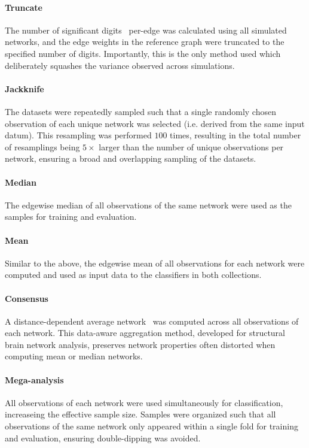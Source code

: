\documentclass[10pt]{SelfArx} %
\begin{document}
\paragraph{Truncate} The number of significant digits~\cite{Parker1997-qq} per-edge was calculated using all
simulated networks, and the edge weights in the reference graph were truncated to the specified number of digits.
Importantly, this is the only method used which deliberately squashes the variance observed across simulations.

\paragraph{Jackknife} The datasets were repeatedly sampled such that a single randomly chosen observation of each
unique network was selected (i.e. derived from the same input datum). This resampling was performed $100$ times,
resulting in the total number of resamplings being $5\times$ larger than the number of unique observations per network,
ensuring a broad and overlapping sampling of the datasets.

\paragraph{Median} The edgewise median of all observations of the same network were used as the samples for training
and evaluation.

\paragraph{Mean} Similar to the above, the edgewise mean of all observations for each network were computed and used
as input data to the classifiers in both collections.

\paragraph{Consensus} A distance-dependent average network~\cite{Betzel2018-eo} was computed across all observations
of each network. This data-aware aggregation method, developed for structural brain network analysis, preserves network
properties often distorted when computing mean or median networks.

\paragraph{Mega-analysis} All observations of each network were used simultaneously for classification, increaseing
the effective sample size. Samples were organized such that all observations of the same network only appeared within a
single fold for training and evaluation, ensuring double-dipping was avoided.
\end{document}
